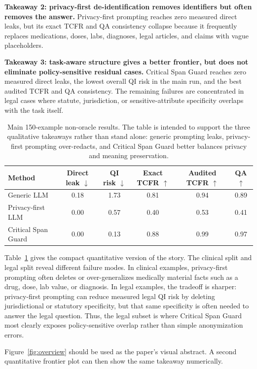 \documentclass{article}
\newcommand{\method}{Critical Span Guard}
\newcommand{\tcfr}{TCFR}
\begin{document}
\textbf{Takeaway 2: privacy-first de-identification removes identifiers but often
removes the answer.}  Privacy-first prompting reaches zero measured direct leaks,
but its exact \tcfr{} and QA consistency collapse because it frequently replaces
medications, doses, labs, diagnoses, legal articles, and claims with vague
placeholders.

\textbf{Takeaway 3: task-aware structure gives a better frontier, but does not
eliminate policy-sensitive residual cases.}  \method{} reaches zero measured
direct leaks, the lowest overall QI risk in the main run, and the best audited
\tcfr{} and QA consistency.  The remaining failures are concentrated in legal
cases where statute, jurisdiction, or sensitive-attribute specificity overlaps
with the task itself.

\begin{table}[t]
\centering
\small
\begin{tabular}{lccccc}
\toprule
Method & Direct leak $\downarrow$ & QI risk $\downarrow$ & Exact \tcfr{} $\uparrow$ & Audited \tcfr{} $\uparrow$ & QA $\uparrow$ \\
\midrule
Generic LLM & 0.18 & 1.73 & 0.81 & 0.94 & 0.89 \\
Privacy-first LLM & 0.00 & 0.57 & 0.40 & 0.53 & 0.41 \\
\method{} & 0.00 & 0.13 & 0.88 & 0.99 & 0.97 \\
\bottomrule
\end{tabular}
\caption{Main 150-example non-oracle results.  The table is intended to support
the three qualitative takeaways rather than stand alone: generic prompting leaks,
privacy-first prompting over-redacts, and \method{} better balances privacy and
meaning preservation.}
\label{tab:main}
\end{table}

Table~\ref{tab:main} gives the compact quantitative version of the story.  The
clinical split and legal split reveal different failure modes.  In clinical
examples, privacy-first prompting often deletes or over-generalizes medically
material facts such as a drug, dose, lab value, or diagnosis.  In legal examples,
the tradeoff is sharper: privacy-first prompting can reduce measured legal QI
risk by deleting jurisdictional or statutory specificity, but that same
specificity is often needed to answer the legal question.  Thus, the legal subset
is where \method{} most clearly exposes policy-sensitive overlap rather than
simple anonymization errors.

Figure~\ref{fig:overview} should be used as the paper's visual abstract.  A
second quantitative frontier plot can then show the same takeaway numerically.
\end{document}

